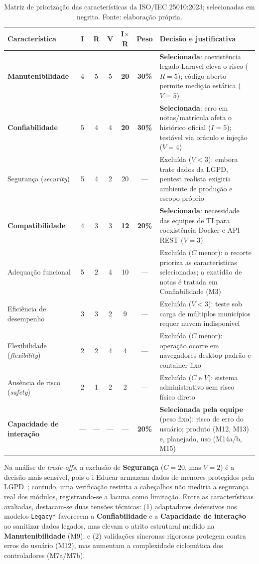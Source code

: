 \documentclass[conference]{model/IEEEtran}%
\begin{document}
\begin{table}[!t]
\centering
\caption{Matriz de priorização das características da ISO/IEC 25010:2023; selecionadas em negrito. Fonte: elaboração própria.}
\label{tab:priorizacao}
\scriptsize
\setlength{\tabcolsep}{2.4pt}
\begin{tabular}{@{}L{2.0cm}cccccL{3.5cm}@{}}
\toprule
\textbf{Característica} & \textbf{I} & \textbf{R} & \textbf{V} & \textbf{I$\times$R} & \textbf{Peso} & \textbf{Decisão e justificativa} \\
\midrule
\textbf{Manutenibilidade} & 4 & 5 & 5 & \textbf{20} & \textbf{30\%} & \textbf{Selecionada}: coexistência legado-Laravel eleva o risco ($R=5$); código aberto permite medição estática ($V=5$) \\
\textbf{Confiabilidade} & 5 & 4 & 4 & \textbf{20} & \textbf{30\%} & \textbf{Selecionada}: erro em notas/matrícula afeta o histórico oficial ($I=5$); testável via oráculo e injeção ($V=4$) \\
Segurança (\textit{security}) & 5 & 4 & 2 & 20 & --- & Excluída ($V<3$): embora trate dados da LGPD, pentest realista exigiria ambiente de produção e escopo próprio \\
\textbf{Compatibilidade} & 4 & 3 & 3 & \textbf{12} & \textbf{20\%} & \textbf{Selecionada}: necessidade das equipes de TI para coexistência Docker e API REST ($V=3$) \\
Adequação funcional & 5 & 2 & 4 & 10 & --- & Excluída ($C$ menor): o recorte prioriza as características selecionadas; a exatidão de notas é tratada em Confiabilidade (M3) \\
Eficiência de desempenho & 3 & 3 & 2 & 9 & --- & Excluída ($V<3$): teste sob carga de múltiplos municípios requer nuvem indisponível \\
Flexibilidade (\textit{flexibility}) & 2 & 2 & 4 & 4 & --- & Excluída ($C$ menor): operação ocorre em navegadores desktop padrão e container fixo \\
Ausência de risco (\textit{safety}) & 2 & 1 & 2 & 2 & --- & Excluída ($C$ e $V$): sistema administrativo sem risco físico direto \\
\textbf{Capacidade de interação} & --- & --- & --- & --- & \textbf{20\%} & \textbf{Selecionada pela equipe} (peso fixo): risco de erro do usuário; produto (M12, M13) e, planejado, uso (M14a/b, M15) \\
\bottomrule
\end{tabular}
\end{table}

Na análise de \textit{trade-offs}, a exclusão de \textbf{Segurança} ($C=20$, mas $V=2$) é a decisão mais sensível, pois o i-Educar armazena dados de menores protegidos pela LGPD~\cite{lgpd2018}; contudo, uma verificação restrita a cabeçalhos não mediria a segurança real dos módulos, registrando-se a lacuna como limitação. Entre as características avaliadas, destacam-se duas tensões técnicas: (1) adaptadores defensivos nos modelos \texttt{Legacy*} favorecem a \textbf{Confiabilidade} e a \textbf{Capacidade de interação} ao sanitizar dados legados, mas elevam o atrito estrutural medido na \textbf{Manutenibilidade} (M9); e (2) validações síncronas rigorosas protegem contra erros do usuário (M12), mas aumentam a complexidade ciclomática dos controladores (M7a/M7b).
\end{document}

